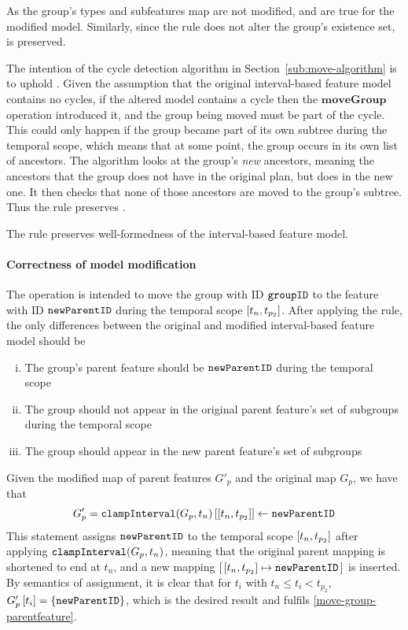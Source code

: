 As the group's types and subfeatures map are not modified,  and  are true for the modified model.  Similarly, since the rule does not alter the group's existence set,  is preserved. 

The intention of the cycle detection algorithm in Section~\vref{sub:move-algorithm} is to uphold . Given the assumption that the original interval-based feature model contains no cycles, if the altered model contains a cycle then the $\textbf{moveGroup}$ operation introduced it, and the group being moved must be part of the cycle. This could only happen if the group became part of its own subtree during the temporal scope, which means that at some point, the group occurs in its own list of ancestors. The algorithm looks at the group's \emph{new} ancestors, meaning the ancestors that the group does not have in the original plan, but does in the new one. It then checks that none of those ancestors are moved to the group's subtree. Thus the rule preserves .
\\

\begin{lemma}
   The  rule preserves well-formedness of the interval-based feature model. 
   \label{lemma:move-group-well-formed}
\end{lemma}

\paragraph{Correctness of model modification}
The operation is intended to move the group with ID $\texttt{groupID}$ to the feature with ID $\texttt{newParentID}$ during the temporal scope $\interval{t_n}{t_{p_2}}$. After applying the  rule, the only differences between the original and modified interval-based feature model should be
\begin{enumerate}[(i)]
   \item The group's parent feature should be $\texttt{newParentID}$ during the temporal scope \label{move-group-parentfeature}
   \item The group should not appear in the original parent feature's set of subgroups during the temporal scope \label{move-group-oldparent}
   \item The group should appear in the new parent feature's set of subgroups \label{move-group-newparent}
\end{enumerate}

Given the modified map of parent features $G'_p$ and the original map $G_p$, we have that
\[
   G'_p = \lookup{\var{clampInterval}(G_p, t_n)}{\interval{t_n}{t_{p_2}}} \assign \var{newParentID}
\]
This statement assigns $\texttt{newParentID}$ to the temporal scope $\interval{t_n}{t_{p_2}}$ after applying $\texttt{clampInterval}(G_p, t_n)$, meaning that the original parent mapping is shortened to end at $t_n$, and a new mapping $\intervalmapping{t_n}{t_{p_2}}{\var{newParentID}}$ is inserted. By semantics of assignment, it is clear that for $t_i$ with $t_n \leq t_i < t_{p_2}$, $G'_p \left[ t_i \right] = \left\{\texttt{newParentID}\right\}$, which is the desired result and fulfils \ref{move-group-parentfeature}.

